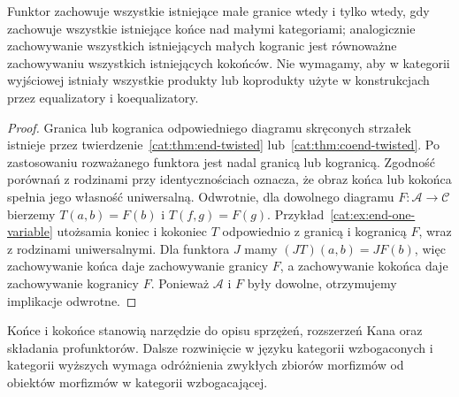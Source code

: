 \begin{wniosek}\label{cat:cor:twisted-preservation}
Funktor zachowuje wszystkie istniejące małe granice wtedy i tylko wtedy, gdy zachowuje wszystkie istniejące końce nad małymi kategoriami; analogicznie zachowywanie wszystkich istniejących małych kogranic jest równoważne zachowywaniu wszystkich istniejących kokońców. Nie wymagamy, aby w kategorii wyjściowej istniały wszystkie produkty lub koprodukty użyte w konstrukcjach przez equalizatory i koequalizatory.
\end{wniosek}
\begin{proof}
Granica lub kogranica odpowiedniego diagramu skręconych strzałek istnieje przez twierdzenie~\ref{cat:thm:end-twisted} lub~\ref{cat:thm:coend-twisted}. Po zastosowaniu rozważanego funktora jest nadal granicą lub kogranicą. Zgodność porównań z rodzinami przy identycznościach oznacza, że obraz końca lub kokońca spełnia jego własność uniwersalną. Odwrotnie, dla dowolnego diagramu $F:\mathcal A\to\mathcal C$ bierzemy $T(a,b)=F(b)$ i $T(f,g)=F(g)$. Przykład~\ref{cat:ex:end-one-variable} utożsamia koniec i kokoniec $T$ odpowiednio z granicą i kogranicą $F$, wraz z rodzinami uniwersalnymi. Dla funktora $J$ mamy $(JT)(a,b)=JF(b)$, więc zachowywanie końca daje zachowywanie granicy $F$, a zachowywanie kokońca daje zachowywanie kogranicy $F$. Ponieważ $\mathcal A$ i $F$ były dowolne, otrzymujemy implikacje odwrotne.
\end{proof}

\begin{uwaga}
Końce i kokońce stanowią narzędzie do opisu sprzężeń, rozszerzeń Kana oraz składania profunktorów. Dalsze rozwinięcie w języku kategorii wzbogaconych i kategorii wyższych wymaga odróżnienia zwykłych zbiorów morfizmów od obiektów morfizmów w kategorii wzbogacającej.
\end{uwaga}
